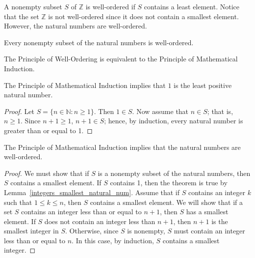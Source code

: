 A  nonempty subset $S$ of ${\mathbb Z}$ is {\bfi well-ordered\/} if $S$ contains a least element.  Notice that the set ${\mathbb Z}$ is not well-ordered since it does not contain a smallest element.  However, the natural numbers are well-ordered. 
 
\medskip
 
Every nonempty subset of the natural numbers is well-ordered. 

\medskip
 
The Principle of Well-Ordering is equivalent to the Principle  of Mathematical Induction. 
 
\begin{lemma}\label{integers_smallest_natural_num}
The Principle of Mathematical Induction implies that $1$ is the least positive natural number. 
\end{lemma}

\begin{proof}
Let $S = \{ n \in {\mathbb N} : n \geq 1 \}$. Then $1 \in S$.  Now assume that $n \in S$; that is, $n \geq 1$.  Since $n+1 \geq 1$, $n+ 1 \in S$; hence, by induction, every natural number is greater than or equal to 1. 
\end{proof}

\begin{theorem}\label{integers_PMI_implies_PWO}
The Principle of Mathematical Induction implies that the natural numbers are well-ordered. 
\end{theorem}
 
\begin{proof}
We must show that if $S$ is a nonempty subset of the natural numbers, then $S$ contains a smallest element.  If $S$ contains 1, then the theorem is true by Lemma~\ref{integers_smallest_natural_num}.  Assume that if $S$ contains an integer $k$ such that $1 \leq k \leq n$, then $S$ contains a smallest element.  We will show that if a set $S$ contains an integer less than or equal to $n + 1$, then $S$ has a smallest element.  If $S$ does not contain an integer less than $n+1$, then $n+1$ is the smallest integer in $S$.  Otherwise, since $S$ is nonempty, $S$ must contain an integer less than or equal to $n$. In this case, by induction, $S$ contains a smallest integer. 
\hspace*{1in} 
\end{proof}
 
\medskip
 
